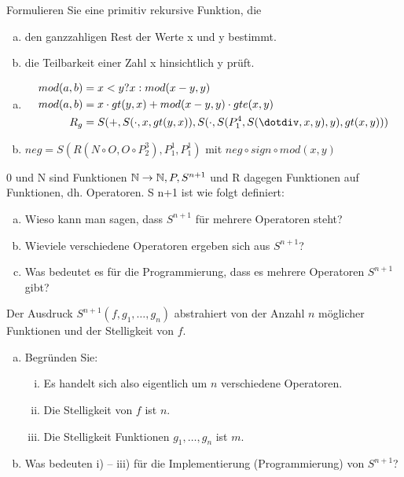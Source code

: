 \begin{card}
  Formulieren Sie eine primitiv rekursive Funktion, die
  \begin{enumerate}[a)]
    \item den ganzzahligen Rest der Werte x und y bestimmt.
    \item die Teilbarkeit einer Zahl x hinsichtlich y prüft.
	\end{enumerate}
	\hr
  \begin{enumerate}[a)]
    \item
      \begin{align*}
        mod(a, b) &= x < y ? x : mod(x-y, y) \\
        mod(a, b) &= x \cdot gt(y, x) + mod(x-y, y) \cdot gte(x ,y) \\
        R_g &= S(+, S(\cdot, x, gt(y, x)), S(\cdot, S(P^4_1, S(\dotdiv, x, y) , y), gt(x ,y)))
      \end{align*}
    \item 
      $neg = S(R(N \circ O, O \circ P^3_2), P^1_1, P^1_1)$ mit
      $neg \circ sign \circ mod(x, y)$
	\end{enumerate}
\end{card}

\begin{card}
  0 und N sind Funktionen $\mathbb{N} \rightarrow \mathbb{N}, P, S^{n+1}$ und R dagegen
  Funktionen auf Funktionen, dh. Operatoren. S n+1 ist wie folgt definiert:

  \begin{enumerate}[a)]
    \item Wieso kann man sagen, dass $S^{n+1}$ für mehrere Operatoren steht?
    \item Wieviele verschiedene Operatoren ergeben sich aus $S^{n+1}$?
    \item Was bedeutet es für die Programmierung, dass es mehrere Operatoren $S^{n+1} $ gibt?
  \end{enumerate}
  \hr
\end{card}

\begin{card}
  Der Ausdruck $S^{n+1}(f, g_1, \ldots, g_n)$ abstrahiert von der Anzahl $n$ möglicher Funktionen und der Stelligkeit von $f$.
  \begin{enumerate}[a)]
    \item Begründen Sie:
    \begin{enumerate}[i)]
      \item Es handelt sich also eigentlich um $n$ verschiedene Operatoren.
      \item Die Stelligkeit von $f$ ist $n$.
      \item Die Stelligkeit Funktionen $g_1, \ldots, g_n$ ist $m$.
    \end{enumerate}
    \item Was bedeuten i) – iii) für die Implementierung (Programmierung) von $S^{n+1}$?
  \end{enumerate}
  \hr
\end{card}

